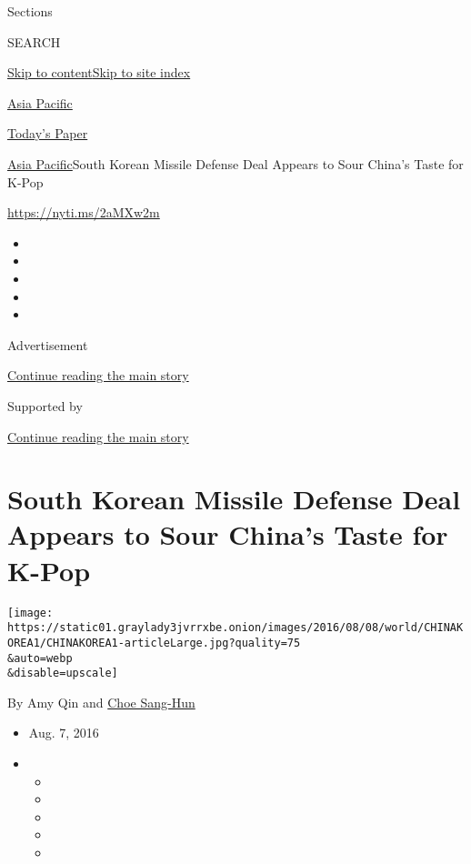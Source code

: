 Sections

SEARCH

\protect\hyperlink{site-content}{Skip to
content}\protect\hyperlink{site-index}{Skip to site index}

\href{https://www.nytimes3xbfgragh.onion/section/world/asia}{Asia
Pacific}

\href{https://myaccount.nytimes3xbfgragh.onion/auth/login?response_type=cookie\&client_id=vi}{}

\href{https://www.nytimes3xbfgragh.onion/section/todayspaper}{Today's
Paper}

\href{/section/world/asia}{Asia Pacific}\textbar{}South Korean Missile
Defense Deal Appears to Sour China's Taste for K-Pop

\url{https://nyti.ms/2aMXw2m}

\begin{itemize}
\item
\item
\item
\item
\item
\end{itemize}

Advertisement

\protect\hyperlink{after-top}{Continue reading the main story}

Supported by

\protect\hyperlink{after-sponsor}{Continue reading the main story}

\hypertarget{south-korean-missile-defense-deal-appears-to-sour-chinas-taste-for-k-pop}{%
\section{South Korean Missile Defense Deal Appears to Sour China's Taste
for
K-Pop}\label{south-korean-missile-defense-deal-appears-to-sour-chinas-taste-for-k-pop}}

\texttt{[image: https://static01.graylady3jvrrxbe.onion/images/2016/08/08/world/CHINAKOREA1/CHINAKOREA1-articleLarge.jpg?quality=75\\\&auto=webp\\\&disable=upscale]}

By Amy Qin and
\href{http://www.nytimes3xbfgragh.onion/by/choe-sang-hun}{Choe Sang-Hun}

\begin{itemize}
\item
  Aug. 7, 2016
\item
  \begin{itemize}
  \item
  \item
  \item
  \item
  \item
  \end{itemize}
\end{itemize}

